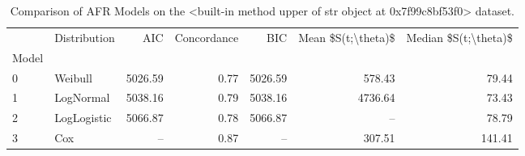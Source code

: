\begin{table}
\centering
\caption{Comparison of AFR Models on the <built-in method upper of str object at 0x7f99c8bf53f0> dataset.}
\label{tab:mnist}
\begin{tabular}{llrrrrr}
\toprule
{} & Distribution &     AIC &  Concordance &     BIC &  Mean \$S(t;\textbackslash theta)\$ &  Median \$S(t;\textbackslash theta)\$ \\
Model &              &         &              &         &                     &                       \\
\midrule
0     &      Weibull & 5026.59 &         0.77 & 5026.59 &              578.43 &                 79.44 \\
1     &    LogNormal & 5038.16 &         0.79 & 5038.16 &             4736.64 &                 73.43 \\
2     &  LogLogistic & 5066.87 &         0.78 & 5066.87 &                 -- &                 78.79 \\
3     &          Cox &     -- &         0.87 &     -- &              307.51 &                141.41 \\
\bottomrule
\end{tabular}
\end{table}
